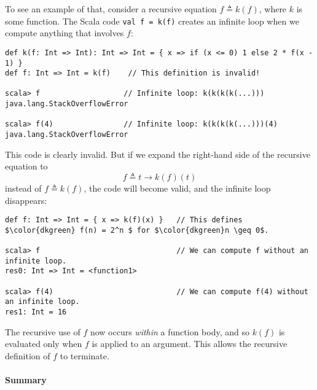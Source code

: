 To see an example of that, consider a recursive equation $f\triangleq k(f)$,
where $k$ is some function. The Scala code \lstinline!val f = k(f)!
creates an infinite loop when we compute anything that involves $f$:
\begin{lstlisting}[mathescape=true]
def k(f: Int => Int): Int => Int = { x => if (x <= 0) 1 else 2 * f(x - 1) }
def f: Int => Int = k(f)    // This definition is invalid!

scala> f                   // Infinite loop: k(k(k(k(...)))
java.lang.StackOverflowError

scala> f(4)                // Infinite loop: k(k(k(k(...)))(4)
java.lang.StackOverflowError
\end{lstlisting}
This code is clearly invalid. But if we expand the right-hand side
of the recursive equation to 
\[
f\triangleq t\rightarrow k(f)(t)
\]
instead of $f\triangleq k(f)$, the code will become valid, and the
infinite loop disappears:
\begin{lstlisting}[mathescape=true]
def f: Int => Int = { x => k(f)(x) }   // This defines $\color{dkgreen} f(n) = 2^n $ for $\color{dkgreen}n \geq 0$.

scala> f                               // We can compute f without an infinite loop.
res0: Int => Int = <function1>

scala> f(4)                            // We can compute f(4) without an infinite loop.
res1: Int = 16
\end{lstlisting}
The recursive use of $f$ now occurs \emph{within} a function body,
and so $k(f)$ is evaluated only when $f$ is applied to an argument.
This allows the recursive definition of $f$ to terminate.

\paragraph{Summary}

